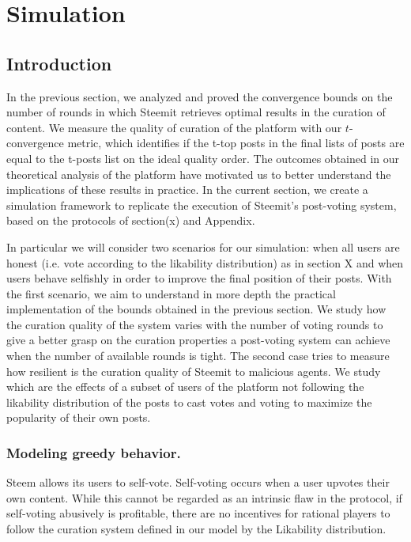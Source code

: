 
\section{Simulation}

\subsection{Introduction}

In the previous section, we analyzed and proved the convergence bounds on the number of rounds in which Steemit retrieves optimal results in the curation of content.
We measure the quality of curation of the platform with our $t$-convergence metric, which identifies if the t-top posts in the final lists of posts are equal to the t-posts list on the ideal quality order.
The outcomes obtained in our theoretical analysis of the platform have motivated us to better understand the implications of these results in practice. In the current section, we create a simulation framework to replicate the execution of Steemit's post-voting system, based on the protocols of section(x) and Appendix.

In particular we will consider two scenarios for our simulation: when all users are honest (i.e. vote according to the likability distribution) as in section X and when users behave selfishly in order to improve the final position of their posts.
With the first scenario, we aim to understand in more depth the practical implementation of the bounds obtained in the previous section. We study how the curation quality of the system varies with the number of voting rounds to give a better grasp on the curation properties a post-voting system can achieve when the number of available rounds is tight.
The second case tries to measure how resilient is the curation quality of Steemit to malicious agents. We study which are the effects of a subset of users of the platform not following the likability distribution of the posts to cast votes and voting to maximize the popularity of their own posts.

\subsubsection*{Modeling greedy behavior.}

Steem allows its users to self-vote. 
Self-voting occurs when a user upvotes their own content. While this cannot be regarded as an intrinsic flaw in the protocol, if self-voting abusively is profitable, there are no incentives for rational players to follow the
curation system defined in our model by the Likability distribution.

